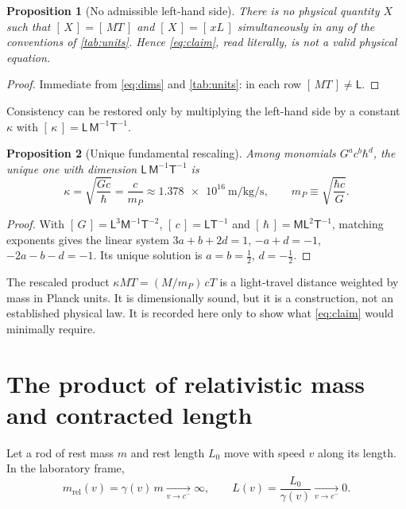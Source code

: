 \documentclass[11pt,a4paper]{article}
\newtheorem{proposition}{Proposition}
\theoremstyle{definition}
\theoremstyle{remark}
\newcommand{\mrel}{m_{\mathrm{rel}}}
\newcommand{\dimof}[1]{\left[\,#1\,\right]}
\newcommand{\sfM}{\mathsf{M}}
\newcommand{\sfL}{\mathsf{L}}
\newcommand{\sfT}{\mathsf{T}}
\begin{document}
\begin{proposition}[No admissible left-hand side]\label{prop:noX}
There is no physical quantity $X$ such that $\dimof{X}=\dimof{MT}$ and
$\dimof{X}=\dimof{xL}$ simultaneously in any of the conventions of
\cref{tab:units}. Hence \cref{eq:claim}, read literally, is not a valid
physical equation.
\end{proposition}

\begin{proof}
Immediate from \cref{eq:dims} and \cref{tab:units}: in each row
$\dimof{MT}\neq\sfL$.
\end{proof}

Consistency can be restored only by multiplying the left-hand side by a
constant $\kappa$ with $\dimof{\kappa}=\sfL\,\sfM^{-1}\sfT^{-1}$.

\begin{proposition}[Unique fundamental rescaling]\label{prop:kappa}
Among monomials $G^{a}c^{b}\hbar^{d}$, the unique one with dimension
$\sfL\,\sfM^{-1}\sfT^{-1}$ is
\begin{equation}
  \kappa=\sqrt{\frac{Gc}{\hbar}}=\frac{c}{m_P}
  \approx \SI{1.378e16}{\metre\per\kilogram\per\second},
  \qquad m_P\equiv\sqrt{\frac{\hbar c}{G}} .
  \label{eq:kappa}
\end{equation}
\end{proposition}

\begin{proof}
With $\dimof{G}=\sfL^3\sfM^{-1}\sfT^{-2}$, $\dimof{c}=\sfL\sfT^{-1}$ and
$\dimof{\hbar}=\sfM\sfL^2\sfT^{-1}$, matching exponents gives the linear system
$3a+b+2d=1$, $-a+d=-1$, $-2a-b-d=-1$. Its unique solution is
$a=b=\tfrac12$, $d=-\tfrac12$.
\end{proof}

The rescaled product $\kappa MT=(M/m_P)\,cT$ is a light-travel distance
weighted by mass in Planck units. It is dimensionally sound, but it is a
construction, not an established physical law. It is recorded here only to
show what \cref{eq:claim} would minimally require.

\section{The product of relativistic mass and contracted length}\label{sec:product}

Let a rod of rest mass $m$ and rest length $L_0$ move with speed $v$ along its
length. In the laboratory frame,
\begin{equation}
  \mrel(v)=\gamma(v)\,m\xrightarrow[v\to c^-]{}\infty,
  \qquad
  L(v)=\frac{L_0}{\gamma(v)}\xrightarrow[v\to c^-]{}0 .
  \label{eq:factors}
\end{equation}
\end{document}
